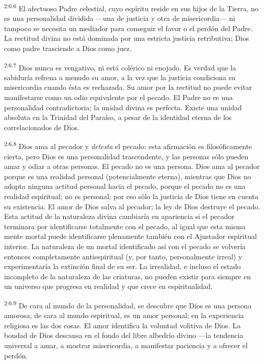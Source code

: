 \par
\textsuperscript{2:6.6} El afectuoso Padre celestial, cuyo espíritu reside en sus hijos de la Tierra, no es una personalidad dividida ---una de justicia y otra de misericordia--- ni tampoco se necesita un mediador para conseguir el favor o el perdón del Padre. La rectitud divina no está dominada por una estricta justicia retributiva; Dios como padre trasciende a Dios como juez.

\par
\textsuperscript{2:6.7} Dios nunca es vengativo, ni está colérico ni enojado. Es verdad que la sabiduría refrena a menudo su amor, a la vez que la justicia condiciona su misericordia cuando ésta es rechazada. Su amor por la rectitud no puede evitar manifestarse como un odio equivalente por el pecado. El Padre no es una personalidad contradictoria; la unidad divina es perfecta. Existe una unidad absoluta en la Trinidad del Paraíso, a pesar de la identidad eterna de los correlacionados de Dios.

\par
\textsuperscript{2:6.8} Dios ama al pecador y \textit{detesta} el pecado: esta afirmación es filosóficamente cierta, pero Dios es una personalidad trascendente, y las personas sólo pueden amar y odiar a otras personas. El pecado no es una persona. Dios ama al pecador porque es una realidad personal
(potencialmente eterna), mientras que Dios no adopta ninguna actitud personal hacia el pecado, porque el pecado no es una realidad espiritual; no es personal; por eso sólo la justicia de Dios tiene en cuenta su existencia. El amor de Dios salva al pecador; la ley de Dios destruye el pecado. Esta actitud de la naturaleza divina cambiaría en apariencia si el pecador terminara por identificarse totalmente con el pecado, al igual que esta misma mente mortal puede identificarse plenamente también con el Ajustador espiritual interior. La naturaleza de un mortal identificado así con el pecado se volvería entonces completamente antiespiritual (y, por tanto, personalmente irreal) y experimentaría la extinción final de su ser. La irrealidad, e incluso el estado incompleto de la naturaleza de las criaturas, no pueden existir para siempre en un universo que progresa en realidad y que crece en espiritualidad.

\par
\textsuperscript{2:6.9} De cara al mundo de la personalidad, se descubre que Dios es una persona amorosa; de cara al mundo espiritual, es un amor personal; en la experiencia religiosa es las dos cosas. El amor identifica la voluntad volitiva de Dios. La bondad de Dios descansa en el fondo del libre albedrío divino ---la tendencia universal a amar, a mostrar misericordia, a manifestar paciencia y a ofrecer el perdón.

